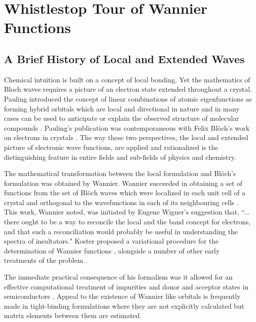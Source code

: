 \chapter{Whistlestop Tour of Wannier Functions}
\label{chap:wannier}
\section{A Brief History of Local and Extended Waves}
Chemical intuition is built on a concept of local bonding. 
Yet the mathematics of Bloch waves requires a picture of an 
electron state extended throughout a crystal.
Pauling introduced the concept of linear combinations of atomic eigenfunctions
as forming hybrid orbitals which are local and directional in nature and
in many cases can be used to anticipate or explain the observed structure
of molecular compounds \cite{pauling28}. Pauling's publication was contemporaneous
with Felix Bl\"och's work on electrons in crystals \cite{bloch29}. The
way these two perspectives, the local and extended picture of electronic wave functions, 
are applied and rationalized is the distinguishing feature 
in entire fields and sub-fields of physics and chemistry.

The mathematical transformation between the local formulation
and Bl\"och's formulation was obtained by Wannier. 
Wannier succeeded in obtaining a set of functions
from the set of Bl\"och waves which were localized in each unit cell
of a crystal and orthogonal to the wavefunctions in each of its
neighbouring cells \cite{wannier37, wannier62}. 
This work, Wannier noted, was initiated by Eugene Wigner's suggestion that, 
``... there ought to be a way to reconcile the local and the band concept 
for electrons, and that such a reconciliation would probably be useful in 
understanding the spectra of insultators." Koster proposed a variational
procedure for the determination of Wannier functions \cite{koster53},
alongside a number of other early treatments of the problem \cite{winston54}.

The immediate practical consequence of his formalism was
it allowed for an effective computational treatment of impurities 
and donor and acceptor states in semiconductors \cite{slater49,kittel54}.
Appeal to the existence of Wannier like orbitals is frequently made in
tight-binding formulations where they are not explicitly calculated but
matrix elements between them are estimated.

